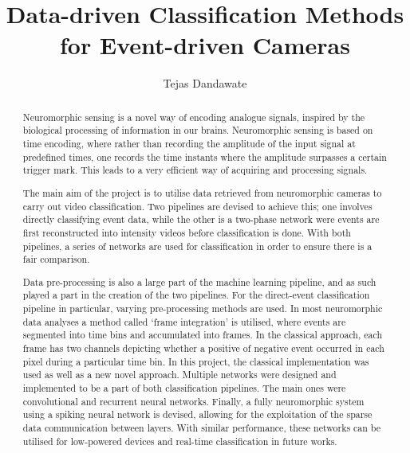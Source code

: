 \documentclass[a4paper, twoside]{report}
\title{Data-driven Classification Methods for Event-driven Cameras}
\author{Tejas Dandawate}
\begin{document}


\begin{abstract}
    Neuromorphic sensing is a novel way of encoding analogue signals, inspired by the biological processing of information in our brains. Neuromorphic sensing is based on time encoding, where rather than recording the amplitude of the input signal at predefined times, one records the time instants where the amplitude surpasses a certain trigger mark. This leads to a very efficient way of acquiring and processing signals.

    The main aim of the project is to utilise data retrieved from neuromorphic cameras to carry out video classification. Two pipelines are devised to achieve this; one involves directly classifying event data, while the other is a two-phase network were events are first reconstructed into intensity videos before classification is done. With both pipelines, a series of networks are used for classification in order to ensure there is a fair comparison.
    
    Data pre-processing is also a large part of the machine learning pipeline, and as such played a part in the creation of the two pipelines. For the direct-event classification pipeline in particular, varying pre-processing methods are used. In most neuromorphic data analyses a method called `frame integration' is utilised, where events are segmented into time bins and accumulated into frames. In the classical approach, each frame has two channels depicting whether a positive of negative event occurred in each pixel during a particular time bin. In this project, the classical implementation was used as well as a new novel approach. Multiple networks were designed and implemented to be a part of both classification pipelines. The main ones  were convolutional and recurrent neural networks. Finally, a fully neuromorphic system using a spiking neural network is devised, allowing for the exploitation of the sparse data communication between layers. With similar performance, these networks can be utilised for low-powered devices and real-time classification in future works.
\end{abstract}
\end{document}
